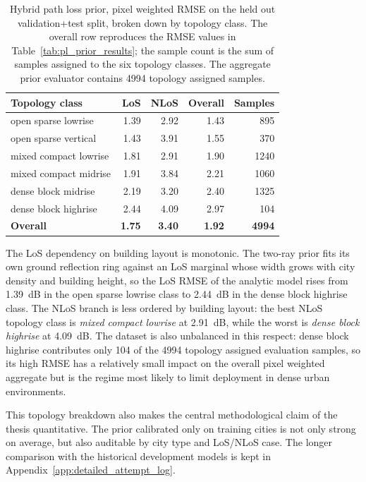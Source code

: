 \begin{table}[!htbp]
\centering
\caption[Hybrid path loss prior RMSE by topology class.]%
{Hybrid path loss prior, pixel weighted RMSE on the
held out validation+test split, broken down by topology class. The
overall row reproduces the RMSE values in Table~\ref{tab:pl_prior_results}; the
sample count is the sum of samples assigned to the six topology classes. The
aggregate prior evaluator contains 4994 topology assigned samples.}
\label{tab:pl_prior_by_topology}
\footnotesize
\begin{tabularx}{\textwidth}{>{\raggedright\arraybackslash}Xrrrr}
\toprule
Topology class & LoS & NLoS & Overall & Samples \\
\midrule
open sparse lowrise   & 1.39 & 2.92 & 1.43 &  895 \\
open sparse vertical  & 1.43 & 3.91 & 1.55 &  370 \\
mixed compact lowrise & 1.81 & 2.91 & 1.90 & 1240 \\
mixed compact midrise & 1.91 & 3.84 & 2.21 & 1060 \\
dense block midrise   & 2.19 & 3.20 & 2.40 & 1325 \\
dense block highrise  & 2.44 & 4.09 & 2.97 &  104 \\
\midrule
\textbf{Overall}        & \textbf{1.75} & \textbf{3.40} & \textbf{1.92} & \textbf{4994} \\
\bottomrule
\end{tabularx}
\end{table}

The LoS dependency on building layout is monotonic. The two-ray prior fits its
own ground reflection ring against an LoS marginal whose width grows with city
density and building height, so the LoS RMSE of the analytic model rises from
\SI{1.39}{dB} in the open sparse lowrise class to
\SI{2.44}{dB} in the dense block highrise class. The NLoS branch is less
ordered by building layout: the best NLoS topology class is
\emph{mixed compact lowrise} at \SI{2.91}{dB}, while the worst is
\emph{dense block highrise} at \SI{4.09}{dB}. The dataset is also unbalanced in
this respect: dense block highrise contributes only 104 of
the 4994 topology assigned evaluation samples, so its high RMSE has a relatively small impact
on the overall pixel weighted aggregate but is the regime most likely
to limit deployment in dense urban environments.

This topology breakdown also makes the central methodological claim of the
thesis quantitative. The prior calibrated only on training cities is not only
strong on average, but also auditable by city type and LoS/NLoS case. The longer comparison with
the historical development models is kept in Appendix~\ref{app:detailed_attempt_log}.

